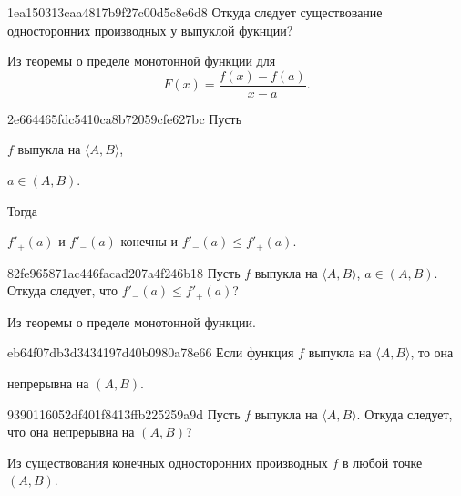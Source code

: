 \begin{note}{1ea150313caa4817b9f27c00d5c8e6d8}
    Откуда следует существование односторонних производных у выпуклой фукнции?

    \begin{cloze}{1}
        Из теоремы о пределе монотонной функции для
        \[
            F(x) = \frac{f(x) - f(a)}{x - a}.
        \]
    \end{cloze}
\end{note}

\begin{note}{2e664465fdc5410ca8b72059cfe627bc}
    Пусть \begin{icloze}{3}\( f \) выпукла на \( \langle A, B \rangle  \),\end{icloze} \begin{icloze}{2}\( a \in (A, B) \).\end{icloze} Тогда \begin{icloze}{1}\( f'_+ (a) \) и \( f'_- (a) \) конечны и \( f'_- (a) \leqslant f'_+ (a) \).\end{icloze}
\end{note}


\begin{note}{82fe965871ac446facad207a4f246b18}
    Пусть \( f \) выпукла на \( \langle A, B \rangle  \), \( a \in (A, B) \).
    Откуда следует, что \( f'_- (a) \leqslant f'_+ (a) \)?

    \begin{cloze}{1}
        Из теоремы о пределе монотонной функции.
    \end{cloze}
\end{note}

\begin{note}{eb64f07db3d3434197d40b0980a78e66}
    Если функция \( f \) выпукла на \( \langle A, B \rangle  \), то она \begin{icloze}{1}непрерывна на \( (A, B) \).\end{icloze}
\end{note}

\begin{note}{9390116052df401f8413ffb225259a9d}
    Пусть \( f \) выпукла на \( \langle A, B \rangle  \). Откуда следует, что она непрерывна на \({ (A, B) }\)?

    \begin{cloze}{1}
        Из существования конечных односторонних производных \({ f }\) в любой точке \({ (A, B) }\).
    \end{cloze}
\end{note}

